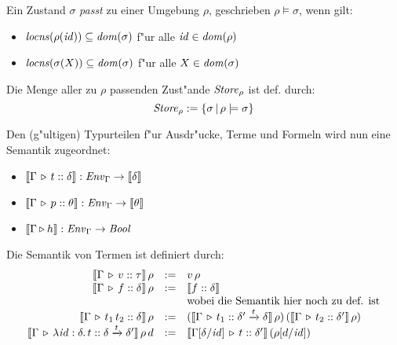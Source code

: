 \documentclass[12pt,a4paper,bigheadings]{scrartcl}
\newcommand{\semantic}[1]{\ensuremath{\llbracket#1\rrbracket}}
\newcommand{\locns}{\name{locns}}
\newcommand{\tto}{\ensuremath{\xrightarrow{t}}}
\begin{document}
\noindent
Ein Zustand $\sigma$ {\em passt} zu einer Umgebung $\rho$, geschrieben $\rho \models \sigma$,
wenn gilt:
\begin{itemize}
  \item $\locns(\rho(\id)) \subseteq \dom{\sigma}$ f"ur alle ${\text{\it id\/}}\in{\text{\it dom\/}}(\rho)$
  \item $\locns(\sigma(X)) \subseteq \dom{\sigma}$ f"ur alle $X\in{\text{\it dom\/}}(\sigma)$
\end{itemize}
Die Menge aller zu $\rho$ passenden Zust"ande ${\text{\it Store\/}}_\rho$ ist def. durch:
\[
  {\text{\it Store\/}}_\rho := \{\sigma\,|\,\rho\models\sigma\}
\]

\noindent
Den (g"ultigen) Typurteilen f"ur Ausdr"ucke, Terme und Formeln wird nun eine Semantik zugeordnet:
\begin{itemize}
  \item $\semantic{\Tj{\Gamma}{t}{\delta}}:\Env_\Gamma \to \semantic{\delta}$
  \item $\semantic{\Tj{\Gamma}{p}{\theta}}:\Env_\Gamma \to \semantic{\theta}$
  \item $\semantic{\Tjh{\Gamma}{h}}: \Env_\Gamma \to \Bool$
\end{itemize}

\pagebreak[3] \noindent
Die Semantik von Termen ist definiert durch:
\[\begin{array}{rcl}
  \semantic{\Tj{\Gamma}{v}{\tau}}\,\rho
  & := &
  v\,\rho
  \\
  \semantic{\Tj{\Gamma}{f}{\delta}}\,\rho
  & := &
  \semantic{\tj{f}{\delta}} \\
  && \text{wobei die Semantik hier noch zu def. ist}
  \\
  \semantic{\Tj{\Gamma}{\app{t_1}{t_2}}{\delta}}\,\rho
  & := &
  (\semantic{\Tj{\Gamma}{t_1}{\delta'\tto\delta}}\,\rho)\,(\semantic{\Tj{\Gamma}{t_2}{\delta'}}\,\rho)
  \\
  \semantic{\Tj{\Gamma}{\abstr{\id:\delta}{t}}{\delta\tto\delta'}}\,\rho\,d
  & := & 
  \semantic{\Tj{\Gamma[\delta/\id]}{t}{\delta'}}\,(\rho[d/\id])
\end{array}\]
\end{document}
